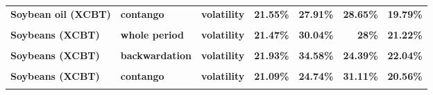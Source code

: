 \documentclass[
  authoryear,
  preprint,
  3p]{elsarticle}
\begin{document}
\begin{longtable}[t]{>{}l>{}l>{}l>{}r>{}r>{}r>{}r}
\textbf{Soybean oil (XCBT)} & \textbf{contango} & \textbf{volatility} & \textcolor[HTML]{4285f4}{\textbf{21.55\%}} & \textcolor[HTML]{4285f4}{\textbf{27.91\%}} & \textcolor[HTML]{4285f4}{\textbf{28.65\%}} & \textcolor[HTML]{4285f4}{\textbf{19.79\%}}\\
\textbf{\cellcolor{gray!10}{Soybeans (XCBT)}} & \textbf{\cellcolor{gray!10}{whole period}} & \textbf{\cellcolor{gray!10}{mean}} & \textcolor[HTML]{4285f4}{\textbf{\cellcolor{gray!10}{6.89\%}}} & \textcolor[HTML]{4285f4}{\textbf{\cellcolor{gray!10}{13.36\%}}} & \textcolor[HTML]{4285f4}{\textbf{\cellcolor{gray!10}{6.19\%}}} & \textcolor[HTML]{4285f4}{\textbf{\cellcolor{gray!10}{-3.82\%}}}\\
\addlinespace
\textbf{Soybeans (XCBT)} & \textbf{whole period} & \textbf{volatility} & \textcolor[HTML]{4285f4}{\textbf{21.47\%}} & \textcolor[HTML]{4285f4}{\textbf{30.04\%}} & \textcolor[HTML]{4285f4}{\textbf{28\%}} & \textcolor[HTML]{4285f4}{\textbf{21.22\%}}\\
\textbf{\cellcolor{gray!10}{Soybeans (XCBT)}} & \textbf{\cellcolor{gray!10}{backwardation}} & \textbf{\cellcolor{gray!10}{mean}} & \textcolor[HTML]{4285f4}{\textbf{\cellcolor{gray!10}{13.69\%}}} & \textcolor[HTML]{4285f4}{\textbf{\cellcolor{gray!10}{0.93\%}}} & \textcolor[HTML]{4285f4}{\textbf{\cellcolor{gray!10}{13.42\%}}} & \textcolor[HTML]{4285f4}{\textbf{\cellcolor{gray!10}{-11.45\%}}}\\
\textbf{Soybeans (XCBT)} & \textbf{backwardation} & \textbf{volatility} & \textcolor[HTML]{4285f4}{\textbf{21.93\%}} & \textcolor[HTML]{4285f4}{\textbf{34.58\%}} & \textcolor[HTML]{4285f4}{\textbf{24.39\%}} & \textcolor[HTML]{4285f4}{\textbf{22.04\%}}\\
\textbf{\cellcolor{gray!10}{Soybeans (XCBT)}} & \textbf{\cellcolor{gray!10}{contango}} & \textbf{\cellcolor{gray!10}{mean}} & \textcolor[HTML]{4285f4}{\textbf{\cellcolor{gray!10}{-0.16\%}}} & \textcolor[HTML]{4285f4}{\textbf{\cellcolor{gray!10}{25.71\%}}} & \textcolor[HTML]{4285f4}{\textbf{\cellcolor{gray!10}{0.96\%}}} & \textcolor[HTML]{4285f4}{\textbf{\cellcolor{gray!10}{3.75\%}}}\\
\textbf{Soybeans (XCBT)} & \textbf{contango} & \textbf{volatility} & \textcolor[HTML]{4285f4}{\textbf{21.09\%}} & \textcolor[HTML]{4285f4}{\textbf{24.74\%}} & \textcolor[HTML]{4285f4}{\textbf{31.11\%}} & \textcolor[HTML]{4285f4}{\textbf{20.56\%}}\\
\addlinespace
\textbf{\cellcolor{gray!10}{Wheat-SRW (XCBT)}} & \textbf{\cellcolor{gray!10}{whole period}} & \textbf{\cellcolor{gray!10}{mean}} & \textcolor[HTML]{4285f4}{\textbf{\cellcolor{gray!10}{5.07\%}}} & \textcolor[HTML]{4285f4}{\textbf{\cellcolor{gray!10}{17.63\%}}} & \textcolor[HTML]{4285f4}{\textbf{\cellcolor{gray!10}{6.68\%}}} & \textcolor[HTML]{4285f4}{\textbf{\cellcolor{gray!10}{-1.58\%}}}\\

\end{longtable}
\end{document}
